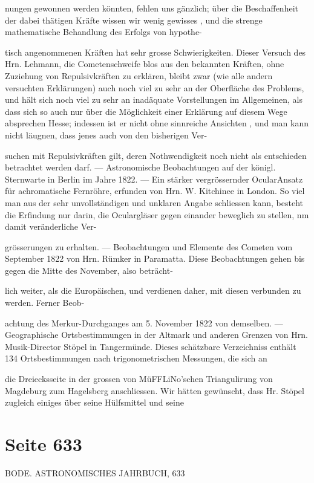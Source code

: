 \documentclass[10pt,a4paper]{article}
\begin{document}
nungen gewonnen werden könnten, fehlen uns gänzlich; über die Beschaffenheit der dabei thätigen Kräfte wissen wir wenig gewisses , und die strenge mathematische Behandlung des Erfolgs von hypothe-

tisch angenommenen Kräften hat sehr grosse Schwierigkeiten. Dieser Versuch des Hrn. Lehmann, die Cometenschweife blos aus den bekannten Kräften, ohne Zuziehung von Repulsivkräften zu erklären, bleibt zwar (wie alle andern versuchten Erklärungen) auch noch viel zu sehr an der Oberfläche des Problems, und hält sich noch viel zu sehr an inadäquate Vorstellungen im Allgemeinen, als dass sich so auch nur über die Möglichkeit einer Erklärung auf diesem Wege absprechen Hesse; indessen ist er nicht ohne sinnreiche Ansichten , und man kann nicht läugnen, dass jenes auch von den bisherigen Ver-

suchen mit Repulsivkräften gilt, deren Nothwendigkeit noch nicht als entschieden betrachtet werden darf. — Astronomische Beobachtungen auf der königl. Sternwarte in Berlin im Jahre 1822. — Ein stärker vergrössernder OcularAnsatz für achromatische Fernröhre, erfunden von Hrn. W. Kitchinee in London. So viel man aus der sehr unvollständigen und unklaren Angabe schliessen kann, besteht die Erfindung nur darin, die Oculargläser gegen einander beweglich zu stellen, nm damit veränderliche Ver-

grösserungen zu erhalten. — Beobachtungen und Elemente des Cometen vom September 1822 von Hrn. Rümker in Paramatta. Diese Beobachtungen gehen bis gegen die Mitte des November, also beträcht-

lich weiter, als die Europäischen, und verdienen daher, mit diesen verbunden zu werden. Ferner Beob-

achtung des Merkur-Durchganges am 5. November 1822 von demselben. — Geographische Ortsbestimmungen in der Altmark und anderen Grenzen von Hrn. Musik-Director Stöpel in Tangermünde. Dieses schätzbare Verzeichniss enthält 134 Ortsbestimmungen nach trigonometrischen Messungen, die sich an

die Dreiecksseite in der grossen von MüFFLiNo'schen Triangulirung von Magdeburg zum Hagelsberg anschliessen. Wir hätten gewünscht, dass Hr. Stöpel zugleich einiges über seine Hülfsmittel und seine


\newpage
\section*{Seite 633}
BODE. ASTRONOMISCHES JAHRBUCH, 633
\end{document}
